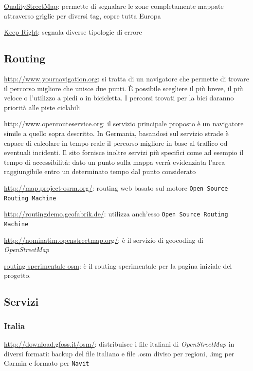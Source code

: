 \documentclass[a4paper,twoside,12pt,]{article}
\newcommand{\osm}{\emph{OpenStreetMap}\xspace}
\newcommand{\soft}[1]{\texttt{#1}}
\begin{document}
\href{http://osmqa2.qualitystreetmap.org/}{QualityStreetMap}: permette di segnalare le zone completamente mappate attraverso griglie per diversi tag, copre tutta Europa

\href{http://keepright.ipax.at/}{Keep Right}: segnala diverse tipologie di errore

\subsection{Routing}
\url{http://www.yournavigation.org}: si tratta di un navigatore che permette di trovare il percorso migliore che unisce due punti. È possibile scegliere il più breve, il più veloce o l'utilizzo a piedi o in bicicletta. I percorsi trovati per la bici daranno priorità alle piste ciclabili

\url{http://www.openrouteservice.org}: il servizio principale proposto è un navigatore simile a quello sopra descritto. In Germania, basandosi sul servizio strade è capace di calcolare in tempo reale il percorso migliore in base al traffico od eventuali incidenti. Il sito fornisce inoltre servizi più specifici come ad esempio il tempo di accessibilità: dato un punto sulla mappa verrà evidenziata l'area raggiungibile entro un determinato tempo dal punto considerato

\url{http://map.project-osrm.org/}: routing web basato sul motore \soft{Open Source Routing Machine}

\url{http://routingdemo.geofabrik.de/}: utilizza anch'esso \soft{Open Source Routing Machine}

\url{http://nominatim.openstreetmap.org/}: è il servizio di geocoding di \osm

\href{http://nroets.dev.openstreetmap.org/demo/index.html?lat=42.8&lon=12.45&zoom=6&layers=B000FTFTT}{routing sperimentale osm}: è il routing sperimentale per la pagina iniziale del progetto.

\subsection{Servizi}

\subsubsection{Italia}
\url{http://download.gfoss.it/osm/}: distribuisce i file italiani di \osm in diversi formati: backup del file italiano e file .osm diviso per regioni, .img per Garmin e formato per \soft{Navit}
\end{document}
